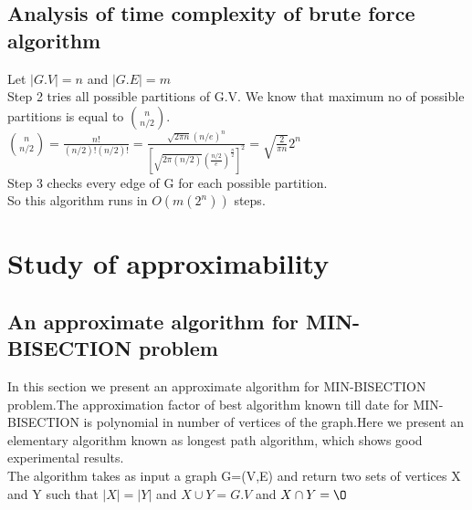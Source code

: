 \documentclass[10pt]{article}
\begin{document}
\subsection{Analysis of time complexity of brute force algorithm}

Let $|G.V| = n$ and $|G.E| = m$\\
Step 2 tries all possible partitions of G.V. We know that maximum no of possible partitions is equal to $\binom{n}{n/2}$.\\

$\binom{n}{n/2} = \frac{n!}{(n/2)!(n/2)!} = \frac{\sqrt{2\pi n}(n/e)^n}{[\sqrt{2\pi (n/2)}(\frac{n/2}{e})^{\frac{n}{2}}]^2} = \sqrt{\frac{2}{\pi n}}2^n$
\newline\\
Step 3 checks every edge of G for each possible partition.\\
So this algorithm runs in $O(m(2^n))$ steps.\\


\section{Study of approximability}

\subsection{An approximate algorithm for MIN-BISECTION problem}

In this section we present an approximate algorithm for MIN-BISECTION problem.The approximation factor of best algorithm known till date for MIN-BISECTION is polynomial in number of vertices of the graph.Here we present an elementary algorithm known as longest path algorithm, which shows good experimental results.\\

The algorithm takes as input a graph G=(V,E) and return two sets of vertices X and Y such that $|X|=|Y|$ and $X \cup Y = G.V $ and $X \cap Y = \O$ \newline

\begin{codebox}
\end{codebox}
\end{document}
